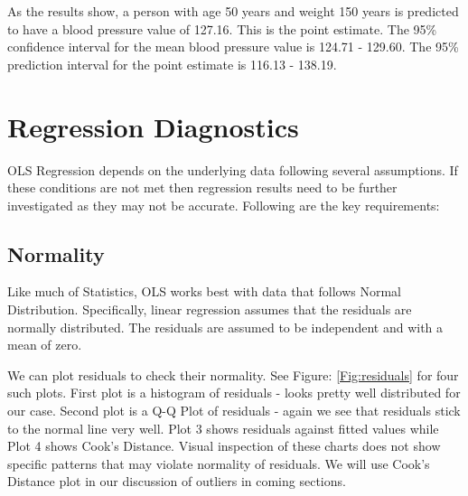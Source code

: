 \documentclass[11pt, letterpaper, twoside]{memoir}\usepackage{knitr}
\begin{document}
As the results show, a person with age 50 years and weight 150 years is predicted to have a blood pressure value of 127.16. This is the point estimate. The 95\% confidence interval for the mean blood pressure value is 124.71 - 129.60. The 95\% prediction interval for the point estimate is 116.13 - 138.19. 

\section{Regression Diagnostics}

OLS Regression depends on the underlying data following several assumptions. If these conditions are not met then regression results need to be further investigated as they may not be accurate. Following are the key requirements:

\subsection{Normality}

Like much of Statistics, OLS works best with data that follows Normal Distribution. Specifically, linear regression assumes that the residuals are normally distributed. The residuals are assumed to be independent and with a mean of zero.

We can plot residuals to check their normality. See Figure: \ref{Fig:residuals} for four such plots. First plot is a histogram of residuals - looks pretty well distributed for our case. Second plot is a Q-Q Plot of residuals - again we see that residuals stick to the normal line very well. Plot 3 shows residuals against fitted values while Plot 4 shows Cook's Distance. Visual inspection of these charts does not show specific patterns that may violate normality of residuals. We will use Cook's Distance plot in our discussion of outliers in coming sections.
\end{document}
